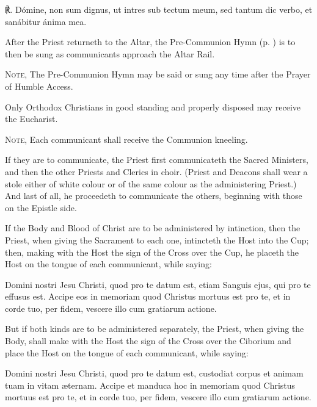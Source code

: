 ℟. Dómine, non sum dignus, ut intres sub tectum meum, sed tantum dic verbo, et sanábitur ánima mea.
\begin{rubric}
	After the Priest returneth to the Altar, the Pre-Communion Hymn (p. \pageref{byzantine}) is to then be sung as communicants approach the Altar Rail.\par
	\textsc{Note,} The Pre-Communion Hymn may be said or sung any time after the Prayer of Humble Access.
\end{rubric}
\begin{rubric}\label{communionrubrics}
    Only Orthodox Christians in good standing and properly disposed may receive the Eucharist.\par
    \textsc{Note,} Each communicant shall receive the Communion kneeling.
\end{rubric}
\begin{rubric}
    If they are to communicate, the Priest first communicateth the Sacred Ministers, and then the other Priests and Clerics in choir. (Priest and Deacons shall wear a stole either of white colour or of the same colour as the administering Priest.) And last of all, he proceedeth to communicate the others, beginning with those on the Epistle side.
\end{rubric}
\begin{rubric}
    If the Body and Blood of Christ are to be administered by intinction, then the Priest, when giving the Sacrament to each one, intincteth the Host into the Cup; then, making with the Host the sign of the Cross over the Cup, he placeth the Host on the tongue of each communicant, while saying:
\end{rubric}
 Domini nostri Jesu Christi, quod pro te datum est, etiam Sanguis ejus, qui pro te effusus est. Accipe eos in memoriam quod Christus mortuus est pro te, et in corde tuo, per fidem, vescere illo cum gratiarum actione.
\begin{rubric}
    But if both kinds are to be administered separately, the Priest, when giving the Body, shall make with the Host the sign of the Cross over the Ciborium and place the Host on the tongue of each communicant, while saying:
\end{rubric}
 Domini nostri Jesu Christi, quod pro te datum est, custodiat corpus et animam tuam in vitam æternam. Accipe et manduca hoc in memoriam quod Christus mortuus est pro te, et in corde tuo, per fidem, vescere illo cum gratiarum actione.
